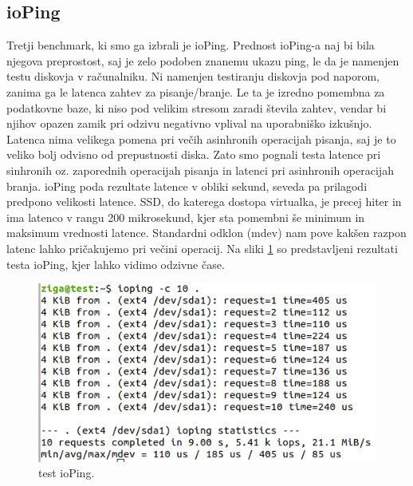 \subsection{ioPing}
Tretji benchmark, ki smo ga izbrali je ioPing. Prednost ioPing-a naj bi bila njegova preprostost, saj je zelo podoben znanemu ukazu ping, le da je namenjen testu diskovja v računalniku. Ni namenjen testiranju diskovja pod naporom, zanima ga le latenca zahtev za pisanje/branje. Le ta je izredno pomembna za podatkovne baze, ki niso pod velikim stresom zaradi števila zahtev, vendar bi njihov opazen zamik pri odzivu negativno vplival na uporabniško izkušnjo. Latenca nima velikega pomena pri večih asinhronih operacijah pisanja, saj je to veliko bolj odvisno od prepustnosti diska. Zato smo pognali testa latence pri sinhronih oz. zaporednih operacijah pisanja in latenci pri asinhronih operacijah branja. ioPing poda rezultate latence v obliki sekund, seveda pa prilagodi predpono velikosti latence. SSD, do katerega dostopa virtualka, je precej hiter in ima latenco v rangu 200 mikrosekund, kjer sta pomembni še minimum in maksimum vrednosti latence. Standardni odklon (mdev) nam pove kakšen razpon latenc lahko pričakujemo pri večini operacij. Na sliki \ref{fig:3_5_ioping1} so predstavljeni rezultati testa ioPing, kjer lahko vidimo odzivne čase.
\begin{figure}[H]
    \centering
    \includegraphics[scale=0.5]{Img/3_ioping1.png}
    \caption{test ioPing.}
    \label{fig:3_5_ioping1}
\end{figure}

